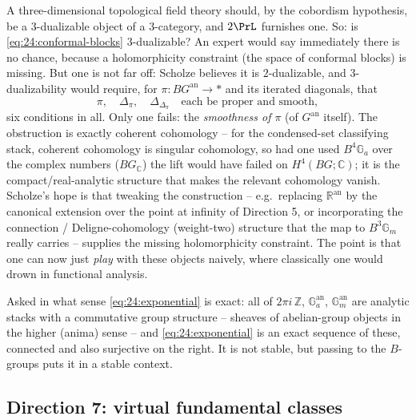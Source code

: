 \begin{remark}[Is it $3$-dualizable?]
\label{rmk:24:dualizable}
A three-dimensional topological field theory should, by the cobordism
hypothesis, be a $3$-dualizable object of a $3$-category, and $2\PrL$ furnishes
one. So: is \eqref{eq:24:conformal-blocks} $3$-dualizable? An expert would say
immediately there is no chance, because a holomorphicity constraint (the space of
conformal blocks) is missing. But one is not far off: Scholze believes it is
$2$-dualizable, and $3$-dualizability would require, for
$\pi\colon BG^{\mathrm{an}}\to\ast$ and its iterated diagonals, that
\begin{equation*}
\pi,\quad \Delta_\pi,\quad \Delta_{\Delta_\pi}
\quad\text{each be proper and smooth} ,
\end{equation*}
six conditions in all. Only one fails: the \emph{smoothness of $\pi$} (of
$G^{\mathrm{an}}$ itself). The obstruction is exactly coherent cohomology -- for
the condensed-set classifying stack, coherent cohomology is singular cohomology,
so had one used $B^4\mathbb G_a$ over the complex numbers ($BG_{\mathbb C}$) the
lift would have failed on $H^4(BG;\mathbb C)$; it is the compact/real-analytic
structure that makes the relevant cohomology vanish. Scholze's hope is that
tweaking the construction -- e.g.\ replacing $\mathbb R^{\mathrm{an}}$ by the
canonical extension over the point at infinity of Direction 5, or incorporating
the connection / Deligne-cohomology (weight-two) structure that the map to
$B^3\mathbb G_m$ really carries -- supplies the missing holomorphicity
constraint. The point is that one can now just \emph{play} with these objects
naively, where classically one would drown in functional analysis.
\end{remark}

\begin{remark}
\label{rmk:24:exponential-stacks}
Asked in what sense \eqref{eq:24:exponential} is exact: all of $2\pi i\,\mathbb Z$,
$\mathbb G_a^{\mathrm{an}}$, $\mathbb G_m^{\mathrm{an}}$ are analytic stacks with a
commutative group structure -- sheaves of abelian-group objects in the higher
(anima) sense -- and \eqref{eq:24:exponential} is an exact sequence of these,
connected and also surjective on the right. It is not stable, but passing to the
$B$-groups puts it in a stable context.
\end{remark}

\subsection{Direction 7: virtual fundamental classes}
\label{subsec:24:vfc}

